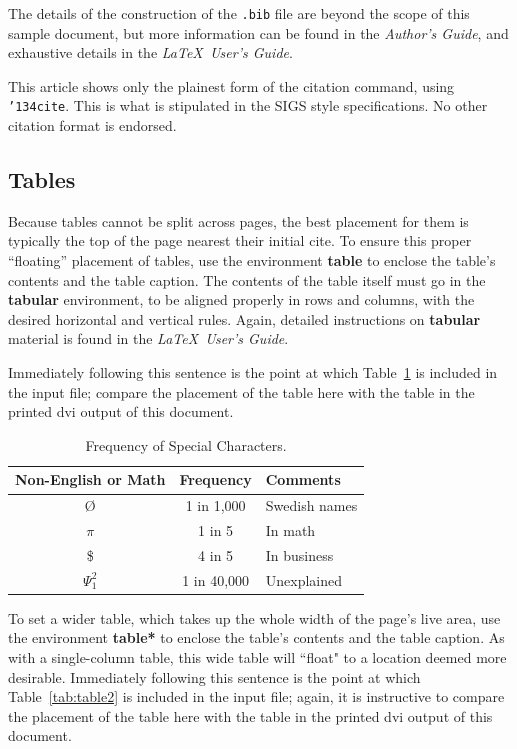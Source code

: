 \documentclass[article]{stucosrec}
\begin{document}
	The details of the construction of the \texttt{.bib} file are beyond the scope of this sample document, but more information can be found in the \textit{Author's Guide}, and exhaustive details in the \textit{\LaTeX\ User's Guide}\cite{Lamport:LaTeX}.
	
	This article shows only the plainest form of the citation command, using \texttt{{\char'134}cite}.
	This is what is stipulated in the SIGS style specifications.
	No other citation format is endorsed.
	
	\subsection{Tables}
	
	Because tables cannot be split across pages, the best placement for them is typically the top of the page nearest their initial cite.
	To ensure this proper ``floating'' placement of tables, use the environment \textbf{table} to enclose the table's contents and the table caption.
	The contents of the table itself must go in the \textbf{tabular} environment, to be aligned properly in rows and columns, with the desired horizontal and vertical rules.
	Again, detailed instructions on \textbf{tabular} material is found in the \textit{\LaTeX\ User's Guide}.
	
	Immediately following this sentence is the point at which Table~\ref{tab:table1} is included in the input file; compare the placement of the table here with the table in the printed dvi output of this document.
	
	\begin{table}
		\centering
		\caption{Frequency of Special Characters.}
		\label{tab:table1}
		\begin{tabular}{|c|c|l|} \hline
			Non-English or Math&Frequency&Comments\\ \hline
			\O & 1 in 1,000& Swedish names\\ \hline
			$\pi$ & 1 in 5& In math\\ \hline
			\$ & 4 in 5 & In business\\ \hline
			$\Psi^2_1$ & 1 in 40,000& Unexplained \\ \hline
		\end{tabular}
	\end{table}

	To set a wider table, which takes up the whole width of the page's live area, use the environment \textbf{table*} to enclose the table's contents and the table caption.
	As with a single-column table, this wide table will ``float" to a location deemed more desirable.
	Immediately following this sentence is the point at which Table~\ref{tab:table2} is included in the input file; again, it is instructive to compare the placement of the table here with the table in the printed dvi output of this document.
	
\end{document}
